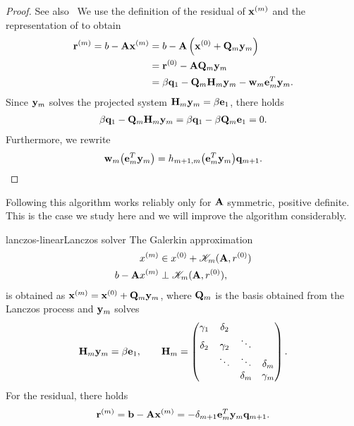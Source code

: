 \begin{proof}
  See also~\cite[Proposition 6.7]{Saad00}
  We use the definition of the residual of $\mathbf x^{(m)}$ and the representation of  to obtain
  \begin{align}
    \mathbf r^{(m)} = b-\mathbf A\mathbf x^{(m)}
    &= b- \mathbf A\left(\mathbf x^{(0)} + \mathbf Q_m\mathbf y_m\right)\\
    &=\mathbf r^{(0)} - \mathbf A\mathbf Q_m\mathbf y_m\\
    &= \beta\mathbf q_1 - \mathbf Q_m\mathbf H_m\mathbf y_m - \mathbf w_m\mathbf e_m^T\mathbf y_m.
  \end{align}
  Since $\mathbf y_m$ solves the projected system
  $\mathbf H_m\mathbf y_m = \beta\mathbf e_1$, there holds
  \begin{gather}
    \beta\mathbf q_1 - \mathbf Q_m\mathbf H_m\mathbf y_m = \beta\mathbf q_1 - \beta \mathbf Q_m\mathbf e_1 = 0.
  \end{gather}
  Furthermore, we rewrite
  \begin{gather}
    \mathbf w_m\bigl(\mathbf e_m^T\mathbf y_m\bigr) = h_{m+1,m} \bigl(\mathbf e_m^T\mathbf y_m\bigr) \mathbf q_{m+1}.
  \end{gather}
\end{proof}

\begin{remark}
  Following  this algorithm
  works reliably only for $\mathbf A$ symmetric, positive definite. This
  is the case we study here and we will improve the algorithm
  considerably.
\end{remark}

\begin{Lemma*}{lanczos-linear}{Lanczos solver}
  The Galerkin approximation   \begin{align}
    x^{(m)} &\in x^{(0)} + \mathscr K_m(\mathbf A,r^{(0)})\\
    b-\mathbf A x^{(m)} &\perp \mathscr K_m(\mathbf A,r^{(0)}),
  \end{align}
  is obtained as $\mathbf x^{(m)} = \mathbf x^{(0)} + \mathbf Q_m \mathbf y_m$, where $\mathbf Q_m$ is the basis obtained from the Lanczos process and $\mathbf y_m$ solves
  \begin{gather}
    \mathbf H_m\mathbf y_m = \beta\mathbf e_1,
    \qquad \mathbf H_m =
    \begin{pmatrix}
      \gamma_1 & \delta_2\\
      \delta_2 & \gamma_2 & \ddots\\
      &\ddots&\ddots&\delta_m\\
      &&\delta_{m}&\gamma_m
    \end{pmatrix}.
  \end{gather}
  For the residual, there holds
  \begin{gather}
    \mathbf r^{(m)} = \mathbf b-\mathbf A\mathbf x^{(m)} = -\delta_{m+1} \mathbf e_m^T \mathbf y_m \mathbf q_{m+1}.
  \end{gather}
\end{Lemma*}

